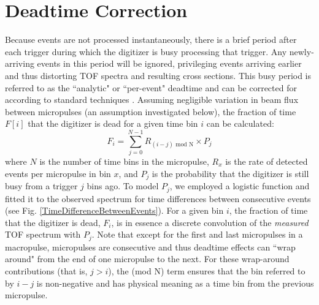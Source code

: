 \section{Deadtime Correction}
Because events are not processed instantaneously, there is a brief period
after each trigger during which the digitizer is busy processing that trigger.
Any newly-arriving events in this period will be ignored,
privileging events arriving earlier and thus distorting
TOF spectra and resulting cross sections. This busy period is referred to as the
``analytic" or ``per-event" deadtime and can be corrected for according to standard 
techniques
\cite{Moore1980}. Assuming negligible variation in beam flux between micropulses
(an assumption investigated below), the fraction of time $F[i]$ that the digitizer is dead 
for a given time bin $i$ can be calculated:
\begin{equation}
    F_{i} = \sum^{N-1}_{j=0} R_{(i-j)\text{ mod N}}\times P_{j}
\end{equation}
where $N$ is the number of time bins in the micropulse, $R_{x}$ is the rate of
detected events per micropulse in bin $x$, and $P_{j}$ is the probability that the
digitizer is still busy from a trigger $j$ bins ago. To model $P_{j}$, we
employed a logistic function and fitted it to the observed spectrum for time
differences between consecutive events (see Fig.
\ref{TimeDifferenceBetweenEvents}). For a given bin $i$, the fraction of time that the 
digitizer is dead, $F_{i}$, is in essence a discrete convolution of the
\textit{measured} TOF spectrum with $P_{j}$. Note that except for the first and
last micropulses in a macropulse, micropulses are consecutive and thus deadtime effects can
``wrap around" from the end of one micropulse to the next. For these wrap-around
contributions (that is, $j>i$), the (mod N) term ensures that the bin referred
to by $i-j$ is non-negative and has physical meaning as a time bin from the previous 
micropulse.

